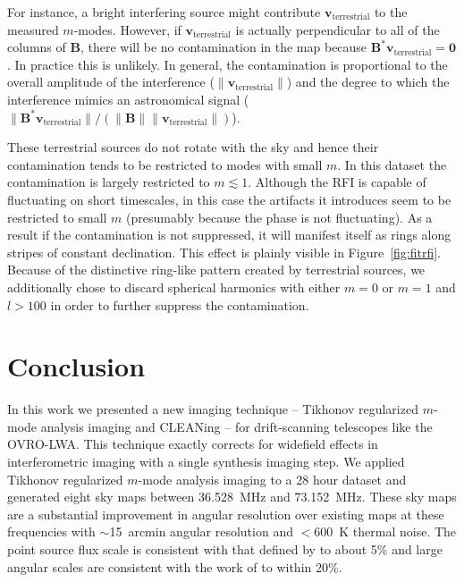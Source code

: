\documentclass[twocolumn]{aastex61}
\renewcommand{\b}{\pmb}
\begin{document}
For instance, a bright interfering source might contribute $\b v_\text{terrestrial}$ to the measured
$m$-modes. However, if $\b v_\text{terrestrial}$ is actually perpendicular to all of the columns of
$\b B$, there will be no contamination in the map because $\b B^*\b v_\text{terrestrial} = \b 0$.
In practice this is unlikely. In general, the contamination is proportional to the overall amplitude
of the interference ($\|\b v_\text{terrestrial}\|$) and the degree to which the interference mimics
an astronomical signal ($\|\b B^*\b v_\text{terrestrial}\|/(\|\b B\|\|\b v_\text{terrestrial}\|)$).

These terrestrial sources do not rotate with the sky and hence their contamination tends to be
restricted to modes with small $m$. In this dataset the contamination is largely restricted to $m
\lesssim 1$. Although the RFI is capable of fluctuating on short timescales, in this case the
artifacts it introduces seem to be restricted to small $m$ (presumably because the phase is not
fluctuating).  As a result if the contamination is not suppressed, it will manifest itself as rings
along stripes of constant declination. This effect is plainly visible in Figure~\ref{fig:fitrfi}.
Because of the distinctive ring-like pattern created by terrestrial sources, we additionally chose
to discard spherical harmonics with either $m=0$ or $m=1$ and $l>100$ in order to further suppress
the contamination.

\section{Conclusion}\label{sec:conclusion}

In this work we presented a new imaging technique -- Tikhonov regularized $m$-mode analysis imaging
and CLEANing -- for drift-scanning telescopes like the OVRO-LWA.  This technique exactly corrects
for widefield effects in interferometric imaging with a single synthesis imaging step.  We applied
Tikhonov regularized $m$-mode analysis imaging to a 28 hour dataset and generated eight sky maps
between 36.528~MHz and 73.152~MHz.  These sky maps are a substantial improvement in angular
resolution over existing maps at these frequencies with $\sim$15~arcmin angular resolution and
$<600$~K thermal noise. The point source flux scale is consistent with that defined by
\citet{2012MNRAS.423L..30S} to about 5\% and large angular scales are consistent with the work of
\citet{2017MNRAS.469.4537D} to within 20\%.
\end{document}
